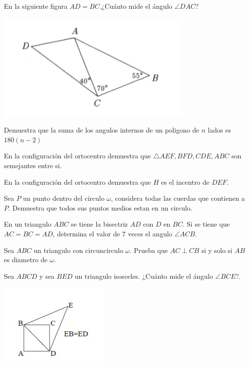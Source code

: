 \documentclass[11pt]{scrartcl}
\begin{document}
\begin{problem}  En la siguiente figura $AD=BC$.¿Cuánto mide el ángulo $\angle DAC$?
\begin{center}
  \includegraphics[scale=0.9]{I1.jpg}  
\end{center}


\end{problem}
\begin{problem}
    Demuestra que la suma de los angulos internos de un poligono de $n$ lados es $180(n-2)$
\end{problem}
\begin{problem}
    En la configuraci\'on del ortocentro demuestra que $\triangle AEF,BFD,CDE,ABC $ son semejantes entre si.
\end{problem}
\begin{problem}
    En la configuraci\'on del ortocentro demuestra que $H$ es el incentro de $DEF$.
\end{problem}
\begin{problem}
    Sea $P$ un punto dentro del circulo $\omega$, considera todas las cuerdas que contienen a $P$. Demuestra que todos sus puntos medios estan en un circulo.
\end{problem}

\begin{problem} 
En un triangulo $ABC$ se tiene la bisectriz $AD$ con $D$ en $BC$. Si se tiene que $AC=BC=AD$, determina el valor de 7 veces el angulo $\angle ACB$.
\end{problem}
\begin{problem}
    Sea $ABC$ un triangulo con circuncirculo $\omega$. Prueba que $AC \perp CB $ si y solo si $AB$ es diametro de $\omega$.
\end{problem}

\begin{problem}
Sea $ABCD$ y sea $BED$ un triangulo isosceles. ¿Cuánto mide el ángulo $\angle BCE$?.
\begin{center}
    \includegraphics{I4.jpg}
\end{center}
\end{problem}
\end{document}
